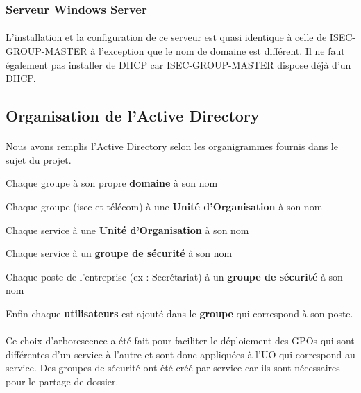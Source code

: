 		\subsubsection{Serveur Windows Server}
			\paragraph{}
				L’installation et la configuration de ce serveur est quasi identique à celle de ISEC-GROUP-MASTER à l’exception que le nom de domaine est différent. Il ne faut également pas installer de DHCP car ISEC-GROUP-MASTER dispose déjà d’un DHCP.


	\subsection{Organisation de l'Active Directory}	
		\paragraph{}
			Nous avons remplis l'Active Directory selon les organigrammes fournis dans le sujet du projet. 

		\begin{description}
			\item Chaque groupe à son propre \textbf{domaine} à son nom
			\item Chaque groupe (isec et télécom) à une \textbf{Unité d'Organisation} à son nom
			\item Chaque service à une \textbf{Unité d'Organisation} à son nom
			\item Chaque service à un \textbf{groupe de sécurité} à son nom 
			\item Chaque poste de l'entreprise (ex : Secrétariat) à un \textbf{groupe de sécurité} à son nom
			\item Enfin chaque \textbf{utilisateurs} est ajouté dans le \textbf{groupe} qui correspond à son poste. 
		\end{description}

		\paragraph{}
			Ce choix d'arborescence a été fait pour faciliter le déploiement des GPOs qui sont différentes d'un service à l'autre et sont donc appliquées à l'UO qui correspond au service. Des groupes de sécurité ont été créé par service car ils sont nécessaires pour le partage de dossier. 

